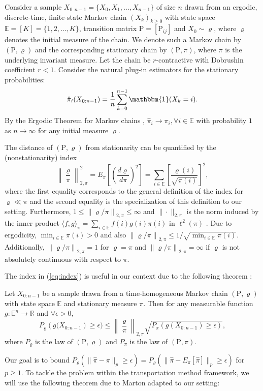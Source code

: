 \documentclass[twoside,11pt]{article}
\begin{document}
 Consider a sample $X_{0:n-1}=\{X_0,X_1,\ldots, X_{n-1}\}$ of size $n$ drawn from an ergodic, discrete-time, finite-state Markov chain $(X_k)_{k\geq 0}$ with state space $\mathbb{E}=[K]=\{1,2,\ldots, K\}$, transition matrix $\mathrm{P}=[\mathrm{P}_{ij}]$ and $X_0\sim \varrho$, where $\varrho$ denotes the initial measure of the chain. We denote such a Markov chain by $(\mathrm{P},\varrho)$ and the corresponding stationary chain by $(\mathrm{P},\pi)$, where $\pi$ is the underlying invariant measure. Let the chain be $r$-contractive with Dobrushin coefficient  $r<1$. Consider the natural plug-in estimators for the stationary probabilities: 
\[
\hat{\pi}_i(X_{0:n-1})=\frac{1}{n}\sum_{k=0}^{n-1}\mathbbm{1}(X_k=i).
\] 
By the Ergodic Theorem for Markov chains \cite{b13}, $\hat{\pi}_i\rightarrow \pi_i, \forall i\in \mathbb{E}$ with probability $1$ as $n\rightarrow \infty$ for any initial measure $\varrho$. 

 The distance of $(\mathrm{P},\varrho)$ from stationarity can be quantified by the (nonstationarity) index \cite{p15}
\begin{equation}\label{eq:index}
\left\|\frac{\varrho}{\pi}\right\|^2_{2,\pi}=E_{\pi}\left[\left(\frac{d\varrho}{d\pi}\right)^2\right]=\sum_{i\in \mathbb{E}} \left[\frac{\varrho(i)}{\sqrt{\pi(i)}}\right]^2,
\end{equation} 
where the first equality corresponds to the general definition of the index for $\varrho\ll \pi$ and the second equality is the specialization of this definition to our setting. Furthermore, $1\leq \left\|\varrho/\pi\right\|_{2,\pi}\leq \infty$ and $\|\cdot\|_{2,\pi}$ is the norm induced by the inner product $\langle f,g \rangle_{\pi}=\sum_{i\in \mathbb{E}} f(i)g(i)\pi(i)$ in $\ell^2(\pi)$ \cite{lpw09}. Due to ergodicity, $\min_{i\in \mathbb{E}}\pi(i)>0$ and also $\left\|\varrho/\pi\right\|_{2,\pi}\leq 1/\sqrt{\min_{i\in \mathbb{E}}\pi(i)}$. Additionally, $\left\|\varrho/\pi\right\|_{2,\pi}=1$ for $\varrho=\pi$  and $\left\|\varrho/\pi\right\|_{2,\pi}=\infty$ if $\varrho$ is not absolutely continuous with respect to $\pi$.

The index in (\ref{eq:index}) is useful in our context due to the following theorem \cite{p15}:
\begin{theorem}\label{thm:Paulin}
 Let $X_{0:n-1}$ be a sample drawn from a time-homogeneous Markov chain $(\mathrm{P},\varrho)$ with state space $\mathbb{E}$ and stationary measure $\pi$. Then for any measurable function $g:\mathbb{E}^{n}\rightarrow \mathbb{R}$ and $\forall \epsilon>0$,
\[
P_{\varrho}\left(g(X_{0:n-1}\right)\geq \epsilon)\leq \left\|\frac{\varrho}{\pi}\right\|_{2,\pi}\sqrt{P_{\pi}(g(X_{0:n-1})\geq \epsilon)},
\]
where $P_{\varrho}$ is the law of $(\mathrm{P},\varrho)$ and  $P_{\pi}$ is the law of $(\mathrm{P},\pi)$. 
\end{theorem} 
Our goal is  to bound $P_{\varrho}(\|\hat{\pi}-\pi\|_{p}\geq \epsilon)=P_{\varrho}(\|\hat{\pi}-E_{\pi}[\hat{\pi}]\|_p\geq \epsilon)$ for  $p\geq 1$. To tackle the problem within the transportation method framework, we will use the following theorem due to Marton \cite{m96} adapted to our setting:
\end{document}
